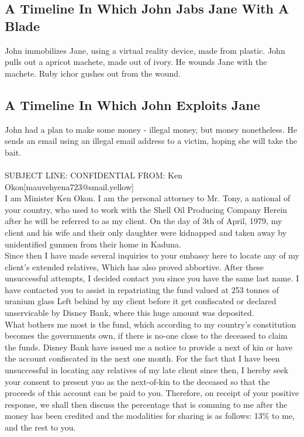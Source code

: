 \documentclass{article}
\begin{document}
\subsection{A Timeline In Which John Jabs Jane With A Blade}


John immobilizes Jane, using a virtual reality device, made from plastic.
John pulls out a apricot machete, made out of ivory.
He wounds Jane with the machete.
Ruby ichor gushes out from the wound.
\subsection{A Timeline In Which John Exploits Jane}


John had a plan to make some money {-} illegal money, but money nonetheless.
He sends an email using an illegal email address to a victim, hoping she will take the bait.
\\\\
SUBJECT LINE: CONFIDENTIAL
FROM: Ken Okon[mauvehyena723@smail.yellow]
\\
I am Minister Ken Okon.
I am the personal attorney to Mr. Tony, a national of your country, who used to work with the Shell Oil Producing Company
Herein after he will be referred to as my client.
On the day of 3th of April, 1979, my client and his wife and their only daughter were kidnapped and taken away by unidentified gunmen from their home in Kaduna.
\\
Since then I have made several inquiries to your embassy here to locate any of my client's extended relatives, Which has also proved abbortive.
After these unsuccessful attempts, I decided contact you since you have the same last name.
I have contacted you to assist in repatriating the fund valued at 253 tonnes of uranium glass Left behind by my client before it get confiscated or declared unservicable by Disney Bank, where this huge amount was deposited.
\\
What bothers me most is the fund, which according to my country's constitution becomes the governments own, if there is no{-}one close to the deceased to claim the funds.
Disney Bank have issued me a notice to provide a next of kin or have the account confiscated in the next one month.
For the fact that I have been unsuccessful in locating any relatives of my late client since then, I hereby seek your consent to present yuo as the next{-}of{-}kin to the deceased so that the proceeds of this account can be paid to you.
Therefore, on receipt of your positive response, we shall then discuss the percentage that is comming to me after the money has been credited and the modalities for sharing is as follows: 13\% to me, and the rest to you.
\end{document}
